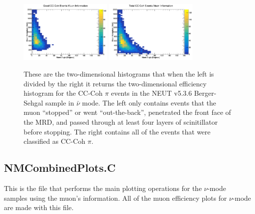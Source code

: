 \documentclass[11pt]{article}
\begin{document}
\begin{figure}[H]
\centering
\includegraphics[width=0.4\textwidth]{NewANMBergerSehgalImages/7.png}
\includegraphics[width=0.4\textwidth]{NewANMBergerSehgalImages/8.png}
\caption{These are the two-dimensional histograms that when the left is divided by the right it returns the two-dimensional efficiency histogram for the CC-Coh $\pi$ events in the NEUT v5.3.6 Berger-Sehgal sample in $\bar{\nu}$ mode. The left only contains events that the muon ``stopped'' or went ``out-the-back'', penetrated the front face of the MRD, and passed through at least four layers of scinitillator before stopping. The right contains all of the events that were classified as CC-Coh $\pi$.}
\label{fig:app:ANMCCCohMuon2DBS}
\end{figure}


\subsection{NMCombinedPlots.C}
\label{sub:NMCombinedPlots.C}
This is the file that performs the main plotting operations for the $\nu$-mode samples using the muon's information. All of the muon efficiency plots for $\nu$-mode are made with this file.
\end{document}
